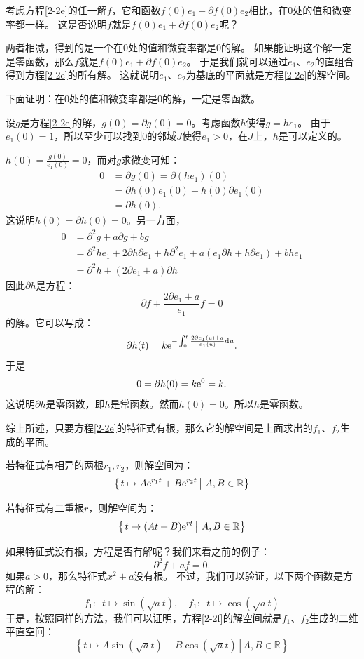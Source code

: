 \documentclass[12pt,UTF8,fontset=none]{ctexbook}
\begin{document}
考虑方程\eqref{2-2e}的任一解$f$，它和函数$f(0)e_1 + \partial f(0) e_2$相比，在$0$处的值和微变率都一样。
这是否说明$f$就是$f(0)e_1 + \partial f(0) e_2$呢？

两者相减，得到的是一个在$0$处的值和微变率都是$0$的解。
如果能证明这个解一定是零函数，那么$f$就是$f(0)e_1 + \partial f(0) e_2$。
于是我们就可以通过$e_1$、$e_2$的直组合得到方程\eqref{2-2e}的所有解。
这就说明$e_1$、$e_2$为基底的平面就是方程\eqref{2-2e}的解空间。

下面证明：在$0$处的值和微变率都是$0$的解，一定是零函数。

设$g$是方程\eqref{2-2e}的解，$g(0) = \partial g(0) = 0$。考虑函数$h$使得$g = he_1$。
由于$e_1(0) = 1$，所以至少可以找到$0$的邻域$J$使得$e_1 > 0$，在$J$上，$h$是可以定义的。

$h(0) = \frac{g(0)}{e_1(0)} = 0$，而对$g$求微变可知：
\begin{align*}
    0 &= \partial g(0) = \partial (he_1) (0) \\
    &= \partial h (0) e_1(0) + h (0) \partial e_1(0) \\
    &= \partial h (0).
\end{align*}
这说明$h(0) = \partial h(0) = 0$。另一方面，
\begin{align*}
    0 &= \partial^2 g + a \partial g + b g \\
    &= \partial^2 h e_1 + 2 \partial h \partial e_1 + h \partial^2 e_1 + a(e_1\partial h + h \partial e_1) + b h e_1 \\
    &= \partial^2 h  + (2 \partial e_1 + a) \partial h
\end{align*}
因此$\partial h$是方程：
$$ \partial f + \frac{2 \partial e_1 + a}{e_1} f = 0 $$
的解。它可以写成：
$$ \partial h (t) = k \mathrm{e}^{-\int_0^t \frac{2 \partial e_1(u) + a}{e_1(u)} \mathrm{d}u}. $$
于是
$$0 = \partial h (0) = k \mathrm{e}^0 = k.$$
这说明$\partial h$是零函数，即$h$是常函数。然而$h(0) = 0$。所以$h$是零函数。

综上所述，只要方程\eqref{2-2e}的特征式有根，那么它的解空间是上面求出的$f_1$、$f_2$生成的平面。

若特征式有相异的两根$r_1, r_2$，则解空间为：
$$ \left\{\left.t \mapsto A\mathrm{e}^{r_1t} + B\mathrm{e}^{r_2t}\,\right|\, A, B \in \mathbb{R}\right\}$$

若特征式有二重根$r$，则解空间为：
$$ \left\{\left.t \mapsto (At + B)\mathrm{e}^{rt}\,\right|\, A, B \in \mathbb{R}\right\}$$

如果特征式没有根，方程是否有解呢？我们来看之前的例子：
\begin{equation}
    \partial^2 f + af = 0. \label{2-2f}
\end{equation}
如果$a>0$，那么特征式$x^2 + a$没有根。
不过，我们可以验证，以下两个函数是方程的解：
$$ f_1: \,\,\, t\mapsto \sin{(\sqrt{a}t)}, \quad f_1: \,\,\, t\mapsto \cos{(\sqrt{a}t)} $$
于是，按照同样的方法，我们可以证明，方程\eqref{2-2f}的解空间就是$f_1$、$f_2$生成的二维平直空间：
$$ \left\{\left.t \mapsto A\sin{(\sqrt{a}t)} + B\cos{(\sqrt{a}t)}\,\right|\, A, B \in \mathbb{R}\right\}$$
\end{document}
